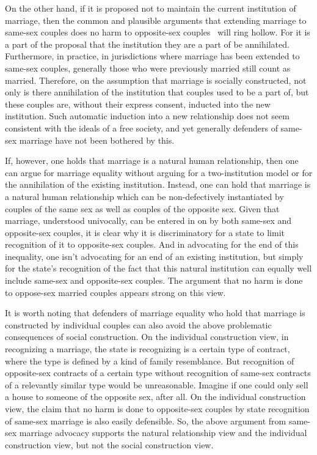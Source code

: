 On the other hand, if it is proposed not to maintain the current institution of marriage, then the common and plausible
arguments that extending marriage to same-sex couples does no harm to opposite-sex couples~\parencite{TwentyYears} will ring hollow. For it is a part of the proposal that the
institution they are a part of be annihilated. Furthermore, in practice, in jurisdictions where marriage has been extended to same-sex couples, generally those who were
previously married still count as married. Therefore, on the assumption that marriage is socially constructed, not only is there annihilation of the institution
that couples used to be a part of, but these couples are, without their express consent, inducted into the new institution. Such automatic induction into a new
relationship does not seem consistent with the ideals of a free society, and yet generally defenders of same-sex marriage have not been bothered by this.

If, however, one holds that marriage is a natural human relationship, then one can argue for marriage equality without arguing for a two-institution model or for
the annihilation of the existing institution. Instead, one can hold that marriage is a natural human relationship which can be non-defectively instantiated by
couples of the same sex as well as couples of the opposite sex. Given that marriage, understood univocally, can be entered in on by both same-sex and opposite-sex couples, it is clear why
it is discriminatory for a state to limit recognition of it to opposite-sex couples. And in advocating for the end of this inequality, one isn't advocating for an end of
an existing institution, but simply for the state's recognition of the fact that this natural institution can equally well include same-sex and opposite-sex couples. The argument that no harm is done to oppose-sex married couples appears strong on this view.

It is worth noting that defenders of marriage equality who  hold that marriage is constructed by individual couples can also avoid the above problematic consequences
of social construction. On the individual construction view, in recognizing a marriage, the state is recognizing is a certain type of contract, where the type is
defined by a kind of family resemblance. But recognition of opposite-sex contracts
of a certain type without recognition of same-sex contracts of a relevantly similar type would be unreasonable. Imagine if one could only sell a house to someone of
the opposite sex, after all. On the individual construction view, the claim that no harm is done to opposite-sex couples by state recognition of same-sex marriage is
also easily defensible. So, the above argument from same-sex marriage advocacy supports the natural relationship view and the individual construction view, but not the social
construction view.

